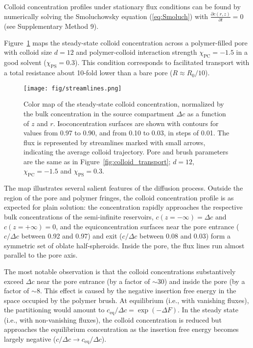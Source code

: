 \documentclass[12pt, a4paper]{article}
\begin{document}
Colloid concentration profiles under stationary flux conditions can be found by numerically solving the Smoluchowsky equation (\ref{eq:Smoluch}) with $\frac{\partial c(r,z)}{\partial t} = 0$  (see Supplementary Method 9). 

Figure~\ref{fig:colloid_concentration} maps the steady-state colloid concentration across a polymer-filled pore with colloid size $d = 12$ and polymer-colloid interaction strength $\chi_{\text{PC}} = -1.5$ in a good solvent ($\chi_{\text{PS}} = 0.3$).
This condition corresponds to facilitated transport with a total resistance about 10-fold lower than a bare pore ($R \approx R_0/10$).

\begin{figure}
    \centering
    \texttt{[image: fig/streamlines.png]}
    \caption{
    Color map of the steady-state colloid concentration, normalized by the bulk concentration in the source compartment $\Delta c$ as a function of $z$ and $r$.
    Isoconcentration surfaces are shown with contours for values from 0.97 to 0.90, and from 0.10 to 0.03, in steps of 0.01.
    The flux is represented by streamlines marked with small arrows, indicating the average colloid trajectory.
    Pore and brush parameters are the same as in Figure~\ref{fig:colloid_transport}; $d = 12$, $\chi_{\text{PC}} = -1.5$ and $\chi_{\text{PS}} = 0.3$.
    }
    \label{fig:colloid_concentration}
\end{figure}

The map illustrates several salient features of the diffusion process.
Outside the region of the pore and polymer fringes, the colloid concentration profile is as expected for plain solution: the concentration rapidly approaches the respective bulk concentrations of the semi-infinite reservoirs, $c(z = -\infty) = \Delta c$ and $c(z = +\infty) = 0$, and the equiconcentration surfaces near the pore entrance ($c/\Delta c$ between 0.92 and 0.97) and exit ($c/\Delta c$ between 0.08 and 0.03) form a symmetric set of oblate half-spheroids.
Inside the pore, the flux lines run almost parallel to the pore axis.

The most notable observation is that the colloid concentrations substantively exceed $\Delta c$ near the pore entrance (by a factor of $\sim30$) and inside the pore (by a factor  of $\sim8$.
This effect is caused by the negative insertion free energy in the space occupied by the polymer brush.
At equilibrium (i.e., with vanishing fluxes), the partitioning would amount to $c_{\text{eq}}/\Delta c = \exp\left( -\Delta F \right)$.
In the steady state (i.e., with non-vanishing fluxes), the colloid concentration is reduced but approaches the equilibrium concentration as the insertion free energy becomes largely negative ($c/\Delta c \to c_{\text{eq}}/\Delta c$).
\end{document}

